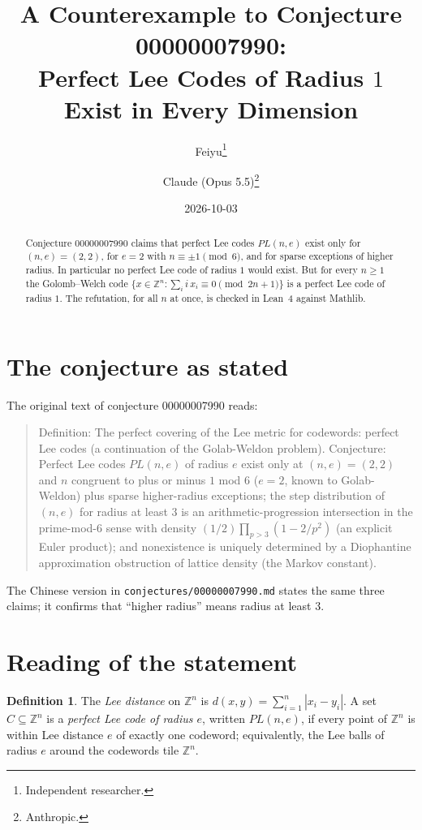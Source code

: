 \documentclass[11pt]{article}
\title{A Counterexample to Conjecture 00000007990:\\
Perfect Lee Codes of Radius $1$ Exist in Every Dimension}
\author{%
  Feiyu\thanks{Independent researcher.}
  \and
  Claude (Opus 5.5)\thanks{Anthropic.}%
}
\date{2026-10-03}
\theoremstyle{plain}
\theoremstyle{definition}
\newtheorem{definition}[theorem]{Definition}
\theoremstyle{remark}
\newcommand{\Z}{\mathbb Z}
\begin{document}
\maketitle

\begin{abstract}
Conjecture 00000007990 claims that perfect Lee codes $PL(n,e)$ exist only for
$(n,e)=(2,2)$, for $e=2$ with $n\equiv\pm1\pmod6$, and for sparse exceptions of higher
radius. In particular no perfect Lee code of radius $1$ would exist. But for every
$n\ge1$ the Golomb--Welch code $\{x\in\Z^n:\sum_i i\,x_i\equiv0\pmod{2n+1}\}$ is a
perfect Lee code of radius $1$. The refutation, for all $n$ at once, is checked in
Lean~4 against Mathlib.
\end{abstract}

\section{The conjecture as stated}

The original text of conjecture 00000007990 reads:

\begin{quote}
Definition: The perfect covering of the Lee metric for codewords: perfect Lee codes (a
continuation of the Golab-Weldon problem). Conjecture: Perfect Lee codes $PL(n,e)$ of
radius $e$ exist only at $(n,e) = (2,2)$ and $n$ congruent to plus or minus $1$ mod $6$
($e = 2$, known to Golab-Weldon) plus sparse higher-radius exceptions; the step
distribution of $(n,e)$ for radius at least $3$ is an arithmetic-progression
intersection in the prime-mod-$6$ sense with density $(1/2) \prod_{p>3} (1-2/p^2)$ (an
explicit Euler product); and nonexistence is uniquely determined by a Diophantine
approximation obstruction of lattice density (the Markov constant).
\end{quote}

The Chinese version in \texttt{conjectures/00000007990.md} states the same three
claims; it confirms that ``higher radius'' means radius at least $3$.

\section{Reading of the statement}

\begin{definition}
The \emph{Lee distance} on $\Z^n$ is $d(x,y)=\sum_{i=1}^n|x_i-y_i|$. A set
$C\subseteq\Z^n$ is a \emph{perfect Lee code of radius $e$}, written $PL(n,e)$, if
every point of $\Z^n$ is within Lee distance $e$ of exactly one codeword; equivalently,
the Lee balls of radius $e$ around the codewords tile $\Z^n$.
\end{definition}
\end{document}
